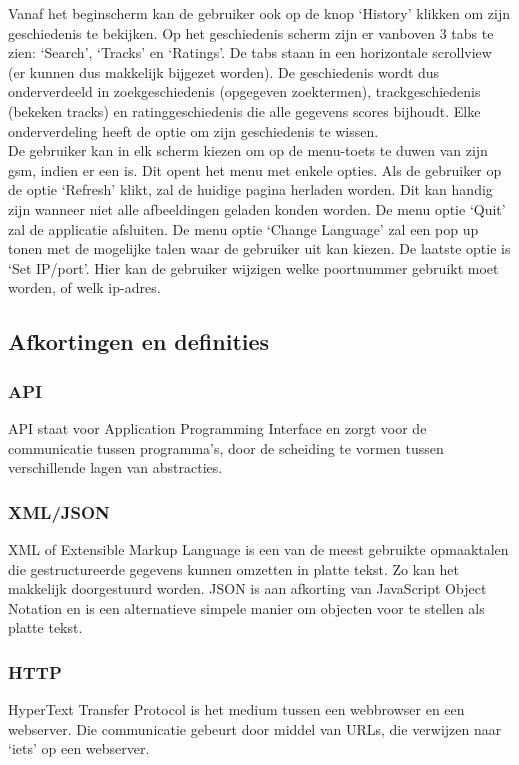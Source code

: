 \documentclass[11pt,a4paper]{article}
\begin{document}
Vanaf het beginscherm kan de gebruiker ook op de knop `History' klikken om zijn geschiedenis te bekijken. Op het geschiedenis scherm zijn er vanboven 3 tabs te zien: `Search', `Tracks' en `Ratings'.  De tabs staan in een horizontale scrollview (er kunnen dus makkelijk bijgezet worden). De geschiedenis wordt dus onderverdeeld in zoekgeschiedenis (opgegeven zoektermen), trackgeschiedenis (bekeken tracks) en ratinggeschiedenis die alle gegevens scores bijhoudt. Elke onderverdeling heeft de optie om zijn geschiedenis te wissen.
\\

De gebruiker kan in elk scherm kiezen om op de menu-toets te duwen van zijn gsm, indien er een is. Dit opent het menu met enkele opties. Als de gebruiker op de optie `Refresh' klikt, zal de huidige pagina herladen worden. Dit kan handig zijn wanneer niet alle afbeeldingen geladen konden worden. De menu optie `Quit' zal de applicatie afsluiten. De menu optie `Change Language' zal een pop up tonen met de mogelijke talen waar de gebruiker uit kan kiezen. De laatste optie is `Set IP/port'. Hier kan de gebruiker wijzigen welke poortnummer gebruikt moet worden, of welk ip-adres.
	
	
	\subsection{Afkortingen en definities}
	\label{sec:Afkortingen en definities}
		\subsubsection{API}
		\label{sec:API}
		API staat voor Application Programming Interface en zorgt voor de communicatie tussen programma's, door de scheiding te vormen tussen verschillende lagen van abstracties.
		\subsubsection{XML/JSON}
		\label{sec:XML/JSON}
		XML of Extensible Markup Language is een van de meest gebruikte opmaaktalen die gestructureerde gegevens kunnen omzetten in platte tekst. Zo kan het makkelijk doorgestuurd worden.
		\newline
		JSON is aan afkorting van JavaScript Object Notation en is een alternatieve simpele manier om objecten voor te stellen als platte tekst.
		\subsubsection{HTTP}
		\label{sec:HTTP}
		HyperText Transfer Protocol is het medium tussen een webbrowser en een webserver. Die communicatie gebeurt door middel van URLs, die verwijzen naar `iets' op een webserver.
\end{document}
